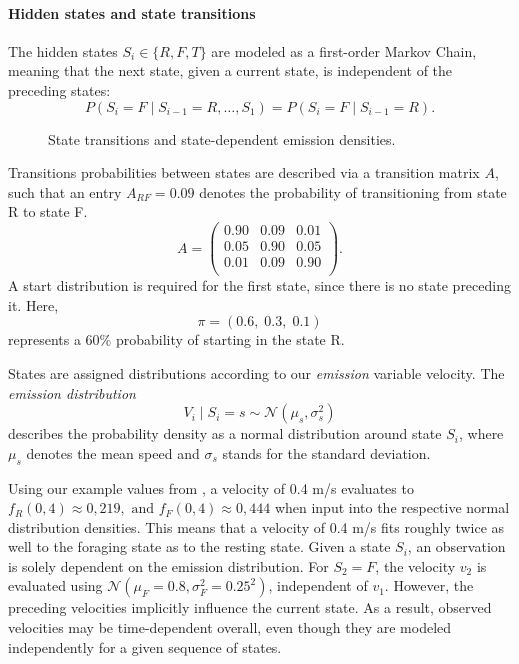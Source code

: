 \paragraph{Hidden states and state transitions}
The hidden states $S_i \in \{R, F, T\}$ are modeled as a first-order Markov Chain, meaning that the next state, given a current state, is independent of the preceding states:
\[
        P(S_i=F\mid S_{i-1}=R,\ldots,S_1)
        =
        P(S_i=F\mid S_{i-1}=R).
\]


\begin{figure}[htbp]
    \centering
    \caption{State transitions and state-dependent emission densities.}
    \label{fig:hmm-states-emissions}
\end{figure}


Transitions probabilities between states are described via a transition matrix $A$, such that an entry $A_{RF}=0.09$ denotes the probability of transitioning from state R to state F.
\[
        A=
        \begin{pmatrix}
            0.90 & 0.09 & 0.01 \\
            0.05 & 0.90 & 0.05 \\
            0.01 & 0.09 & 0.90 \\
        \end{pmatrix}.
    \]
A start distribution is required for the first state, since there is no state preceding it.
Here,
\[
    \pi=(0.6,\;0.3,\;0.1)
\]
represents a $60\%$ probability of starting in the state R.

States are assigned distributions according to our \emph{emission} variable velocity.
The \emph{emission distribution}
\[
    V_i\mid S_i=s\sim\mathcal N(\mu_s,\sigma_s^2)
\]
describes the probability density as a normal distribution around state $S_i$, where $\mu_s$ denotes the mean speed and $\sigma_s$ stands for the standard deviation.

Using our example values from , a velocity of 0.4 m/s evaluates to \(
f_R(0{,}4)\approx0{,}219,
\text{ and } f_F(0{,}4)\approx0{,}444
\)
when input into the respective normal distribution densities.
This means that a velocity of 0.4 m/s fits roughly twice as well to the foraging state as to the resting state.
Given a state $S_i$, an observation is solely dependent on the emission distribution.
For $S_2 = F$, the velocity $v_2$ is evaluated using $\mathcal{N}(\mu_F=0.8, \sigma_F^2=0.25^2)$, independent of $v_1$.
However, the preceding velocities implicitly influence the current state.
As a result, observed velocities may be time-dependent overall, even though they are modeled independently for a given sequence of states.

